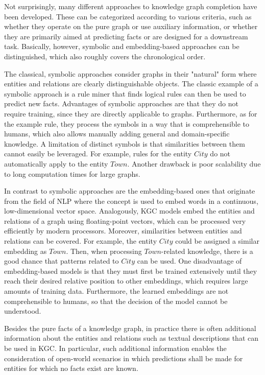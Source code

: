 Not surprisingly, many different approaches to knowledge graph completion have been developed. These can be categorized according to various criteria, such as whether they operate on the pure graph or use auxiliary information, or whether they are primarily aimed at predicting facts or are designed for a downstream task. Basically, however, symbolic and embedding-based approaches can be distinguished, which also roughly covers the chronological order.

The classical, symbolic approaches consider graphs in their "natural" form where entities and relations are clearly distinguishable objects. The classic example of a symbolic approach is a rule miner that finds logical rules can then be used to predict new facts. Advantages of symbolic approaches are that they do not require training, since they are directly applicable to graphs. Furthermore, as for the example rule, they process the symbols in a way that is comprehensible to humans, which also allows manually adding general and domain-specific knowledge. A limitation of distinct symbols is that similarities between them cannot easily be leveraged. For example, rules for the entity $City$ do not automatically apply to the entity $Town$. Another drawback is poor scalability due to long computation times for large graphs.

In contrast to symbolic approaches are the embedding-based ones that originate from the field of NLP where the concept is used to embed words in a continuous, low-dimensional vector space. Analogously, KGC models embed the entities and relations of a graph using floating-point vectors, which can be processed very efficiently by modern processors. Moreover, similarities between entities and relations can be covered. For example, the entity $City$ could be assigned a similar embedding as $Town$. Then, when processing $Town$-related knowledge, there is a good chance that patterns related to $City$ can be used. One disadvantage of embedding-based models is that they must first be trained extensively until they reach their desired relative position to other embeddings, which requires large amounts of training data. Furthermore, the learned embeddings are not comprehensible to humans, so that the decision of the model cannot be understood.

Besides the pure facts of a knowledge graph, in practice there is often additional information about the entities and relations such as textual descriptions that can be used in KGC. In particular, such additional information enables the consideration of open-world scenarios in which predictions shall be made for entities for which no facts exist are known.

